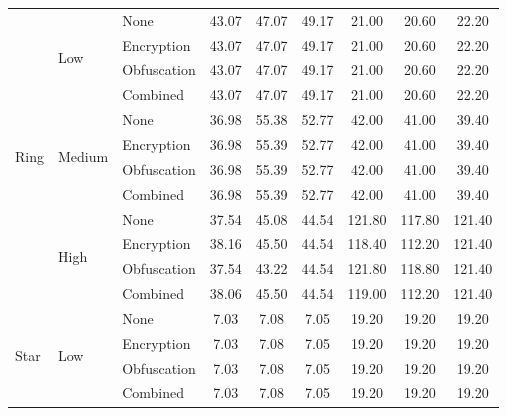 \begin{table}[!t]
\begin{tabular}{lllccc ccc}
\midrule
\multirow{12}{*}{Ring} & \multirow{4}{*}{Low} & None & \cellcolor[gray]{0.70}43.07 & 47.07 & 49.17 & 21.00 & 20.60 & \cellcolor[gray]{0.70}22.20 \\
 &  & Encryption & \cellcolor[gray]{0.70}43.07 & 47.07 & 49.17 & 21.00 & 20.60 & \cellcolor[gray]{0.70}22.20 \\
 &  & Obfuscation & \cellcolor[gray]{0.70}43.07 & 47.07 & 49.17 & 21.00 & 20.60 & \cellcolor[gray]{0.70}22.20 \\
 &  & Combined & \cellcolor[gray]{0.70}43.07 & 47.07 & 49.17 & 21.00 & 20.60 & \cellcolor[gray]{0.70}22.20 \\
\cmidrule(lr){2-9}
 & \multirow{4}{*}{Medium} & None & \cellcolor[gray]{0.70}36.98 & 55.38 & 52.77 & \cellcolor[gray]{0.70}42.00 & 41.00 & 39.40 \\
 &  & Encryption & \cellcolor[gray]{0.70}36.98 & 55.39 & 52.77 & \cellcolor[gray]{0.70}42.00 & 41.00 & 39.40 \\
 &  & Obfuscation & \cellcolor[gray]{0.70}36.98 & 55.39 & 52.77 & \cellcolor[gray]{0.70}42.00 & 41.00 & 39.40 \\
 &  & Combined & \cellcolor[gray]{0.70}36.98 & 55.39 & 52.77 & \cellcolor[gray]{0.70}42.00 & 41.00 & 39.40 \\
\cmidrule(lr){2-9}
 & \multirow{4}{*}{High} & None & \cellcolor[gray]{0.70}37.54 & 45.08 & 44.54 & \cellcolor[gray]{0.70}121.80 & 117.80 & 121.40 \\
 &  & Encryption & \cellcolor[gray]{0.70}38.16 & 45.50 & 44.54 & 118.40 & 112.20 & \cellcolor[gray]{0.70}121.40 \\
 &  & Obfuscation & \cellcolor[gray]{0.70}37.54 & 43.22 & 44.54 & \cellcolor[gray]{0.70}121.80 & 118.80 & 121.40 \\
 &  & Combined & \cellcolor[gray]{0.70}38.06 & 45.50 & 44.54 & 119.00 & 112.20 & \cellcolor[gray]{0.70}121.40 \\
\midrule
\multirow{12}{*}{Star} & \multirow{4}{*}{Low} & None & \cellcolor[gray]{0.70}7.03 & 7.08 & 7.05 & \cellcolor[gray]{0.70}19.20 & \cellcolor[gray]{0.70}19.20 & \cellcolor[gray]{0.70}19.20 \\
 &  & Encryption & \cellcolor[gray]{0.70}7.03 & 7.08 & 7.05 & \cellcolor[gray]{0.70}19.20 & \cellcolor[gray]{0.70}19.20 & \cellcolor[gray]{0.70}19.20 \\
 &  & Obfuscation & \cellcolor[gray]{0.70}7.03 & 7.08 & 7.05 & \cellcolor[gray]{0.70}19.20 & \cellcolor[gray]{0.70}19.20 & \cellcolor[gray]{0.70}19.20 \\
 &  & Combined & \cellcolor[gray]{0.70}7.03 & 7.08 & 7.05 & \cellcolor[gray]{0.70}19.20 & \cellcolor[gray]{0.70}19.20 & \cellcolor[gray]{0.70}19.20 \\

\end{tabular}
\end{table}
